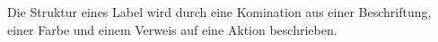 \documentclass{article}
\begin{document}
    Die Struktur eines Label wird durch eine Komination aus einer Beschriftung, einer Farbe und einem Verweis auf eine Aktion beschrieben.
\end{document}
